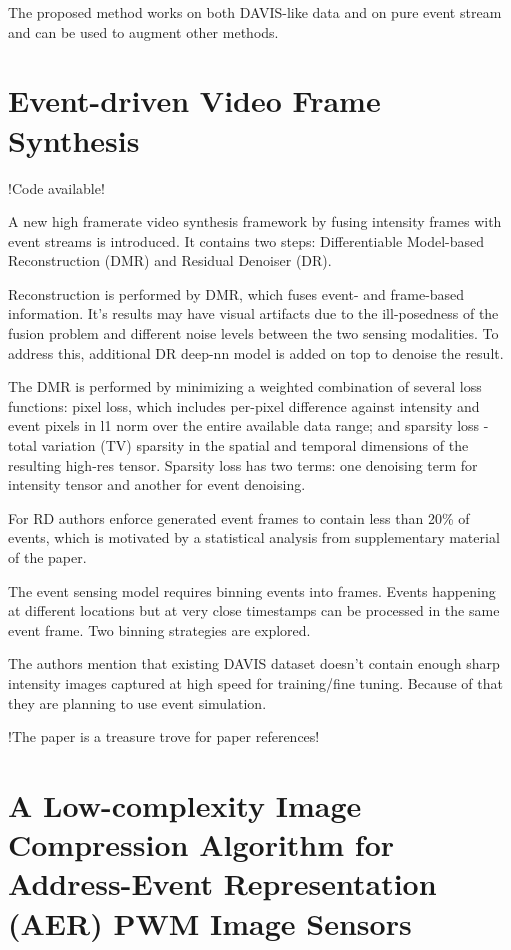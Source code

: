 \documentclass[10pt,a4paper]{article}
\begin{document}
The proposed method works on both DAVIS-like data and on pure event stream and can be used to augment other methods.

\section{Event-driven Video Frame Synthesis}
!Code available!

A new high framerate video synthesis framework by fusing intensity frames with event streams is introduced.
It contains two steps: Differentiable Model-based Reconstruction (DMR) and Residual Denoiser (DR).

Reconstruction is performed by DMR, which fuses event- and frame-based information. 
It's results may have visual artifacts due to the ill-posedness of the fusion problem and different noise levels between the two sensing modalities.
To address this, additional DR deep-nn model is added on top to denoise the result.

The DMR is performed by minimizing a weighted combination of several loss functions: 
pixel loss, which includes per-pixel difference against intensity and event pixels in l1 norm over the entire available data range;
and sparsity loss - total variation (TV) sparsity in the spatial and temporal dimensions of the resulting high-res tensor.
Sparsity loss has two terms: one denoising term for intensity tensor and another for event denoising.

For RD authors enforce generated event frames to contain less than 20\% of events, which is motivated by a statistical analysis from supplementary material of the paper.

The event sensing model requires binning events into frames. 
Events happening at different locations but at very close timestamps can be processed in the same event frame.
Two binning strategies are explored.

The authors mention that existing DAVIS dataset doesn't contain enough sharp intensity images captured at high speed for training/fine tuning. 
Because of that they are planning to use event simulation.

!The paper is a  treasure trove for paper references!

\section{A Low-complexity Image Compression Algorithm for Address-Event Representation (AER) PWM Image Sensors}
\end{document}
